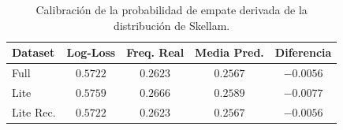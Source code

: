 \begin{table}[htbp]
    \centering
    \caption{Calibraci\'on de la probabilidad de empate derivada de la distribuci\'on de Skellam.}
    \label{tab:skellam_draw}
    \begin{tabular}{lcccc}
        \toprule
        \textbf{Dataset} & \textbf{Log-Loss} & \textbf{Freq. Real} & \textbf{Media Pred.} & \textbf{Diferencia} \\
        \midrule
        Full & $0.5722$ & $0.2623$ & $0.2567$ & $-0.0056$ \\
        Lite & $0.5759$ & $0.2666$ & $0.2589$ & $-0.0077$ \\
        Lite Rec. & $0.5722$ & $0.2623$ & $0.2567$ & $-0.0056$ \\
        \bottomrule
    \end{tabular}
\end{table}
